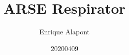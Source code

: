 \documentclass[two column, oneside]{article}
\title{ARSE Respirator}
\author{Enrique Alapont}
\date{20200409}
\begin{document}
 
    \maketitle
    
    
    
    
    
    
    
    
    \clearpage
    \listoffigures
    
    
    
    \onecolumn
    \appendix
    \appendixpage
    
    
\end{document}
